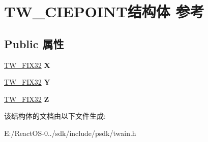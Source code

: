 \hypertarget{struct_t_w___c_i_e_p_o_i_n_t}{}\section{T\+W\+\_\+\+C\+I\+E\+P\+O\+I\+N\+T结构体 参考}
\label{struct_t_w___c_i_e_p_o_i_n_t}
\subsection*{Public 属性}
\begin{DoxyCompactItemize}
\item 
\mbox{\label{struct_t_w___c_i_e_p_o_i_n_t_a15b059a1a11cdef002a83fdbeb06e61f}} 
\hyperlink{struct_t_w___f_i_x32}{T\+W\+\_\+\+F\+I\+X32} {\bfseries X}
\item 
\mbox{\label{struct_t_w___c_i_e_p_o_i_n_t_a2dd6bede0f24d0eefed2f7ac80dba756}} 
\hyperlink{struct_t_w___f_i_x32}{T\+W\+\_\+\+F\+I\+X32} {\bfseries Y}
\item 
\mbox{\label{struct_t_w___c_i_e_p_o_i_n_t_ad64fbccc0a3d3b0995943ed832a9bb54}} 
\hyperlink{struct_t_w___f_i_x32}{T\+W\+\_\+\+F\+I\+X32} {\bfseries Z}
\end{DoxyCompactItemize}


该结构体的文档由以下文件生成\+:\begin{DoxyCompactItemize}
\item 
E\+:/\+React\+O\+S-\/0../sdk/include/psdk/twain.\+h\end{DoxyCompactItemize}
